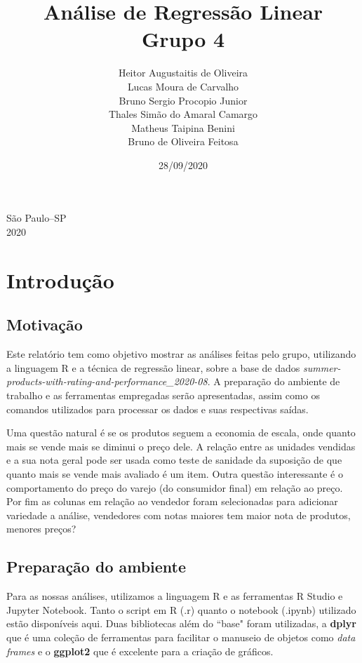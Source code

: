 \documentclass[12pt, a4paper]{article}
\title{Análise de Regressão Linear \\ Grupo 4}
\author{Heitor Augustaitis de Oliveira \\
        Lucas Moura de Carvalho \\
        Bruno Sergio Procopio Junior \\
        Thales Simão do Amaral Camargo \\
        Matheus Taipina Benini \\
        Bruno de Oliveira Feitosa }
\date{28/09/2020}
\begin{document}
\maketitle

\thispagestyle{empty} %

\begin{center}
    \vspace*{\fill}	
    São Paulo–SP\\
    2020
\end{center}

\newpage

\tableofcontents

\thispagestyle{empty}

\newpage

\section{Introdução}

\subsection{Motivação}

Este relatório tem como objetivo mostrar as análises feitas pelo grupo, utilizando a
linguagem R e a técnica de regressão linear, sobre a base de dados
\emph{summer-products-with-rating-and-performance\_2020-08}. A preparação do ambiente de
trabalho e as ferramentas empregadas serão apresentadas, assim como os comandos
utilizados para processar os dados e suas respectivas saídas.

Uma questão natural é se os produtos seguem a economia de escala, onde quanto mais se vende mais se diminui o preço dele. A relação entre as unidades vendidas e a sua nota geral pode ser usada como teste de sanidade da suposição de que quanto mais se vende mais avaliado é um item. Outra questão interessante é o comportamento do preço do varejo (do consumidor final) em relação ao preço. Por fim as colunas em relação ao vendedor foram selecionadas para adicionar variedade a análise, vendedores com notas maiores tem maior nota de produtos, menores preços?

\subsection{Preparação do ambiente}

Para as nossas análises, utilizamos a linguagem R e as ferramentas R Studio e Jupyter
Notebook. Tanto o script em R (.r) quanto o notebook (.ipynb) utilizado estão disponíveis aqui. Duas bibliotecas além do ``base" foram utilizadas, a \textbf{dplyr} que é uma coleção de ferramentas para facilitar o manuseio de objetos como \emph{data frames} e o \textbf{ggplot2} que é excelente para a criação de gráficos.
\end{document}
